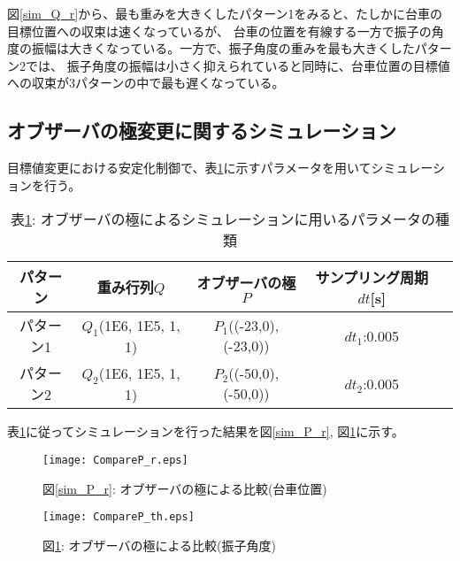 図\ref{sim_Q_r}から、最も重みを大きくしたパターン1をみると、たしかに台車の目標位置への収束は速くなっているが、
台車の位置を有線する一方で振子の角度の振幅は大きくなっている。一方で、振子角度の重みを最も大きくしたパターン2では、
振子角度の振幅は小さく抑えられていると同時に、台車位置の目標値への収束が3パターンの中で最も遅くなっている。

\subsection{オブザーバの極変更に関するシミュレーション}
目標値変更における安定化制御で、表\ref{sim_P}に示すパラメータを用いてシミュレーションを行う。

\begin{table}[htbp]
    \begin{center}
        \caption{表\ref{sim_P}: オブザーバの極によるシミュレーションに用いるパラメータの種類}
        \begin{tabular}{|c|c|c|c|c|} \hline
            パターン & 重み行列$Q$ & オブザーバの極$P$ & サンプリング周期$dt$[s] \\ \hline \hline
            パターン1 & $Q_1$(1E6, 1E5, 1, 1) & $P_1$((-23,0), (-23,0)) & $dt_1$:0.005 \\ \hline
            パターン2 & $Q_2$(1E6, 1E5, 1, 1) & $P_2$((-50,0), (-50,0)) & $dt_2$:0.005 \\ \hline
        \end{tabular}
        \label{sim_P}
    \end{center}
\end{table}

表\ref{sim_P}に従ってシミュレーションを行った結果を図\ref{sim_P_r}, 図\ref{sim_P_th}に示す。

\begin{figure}[htbp]
    \begin{minipage}{0.5\hsize}
        \begin{center}
            \texttt{[image: CompareP\_r.eps]}
            \caption{図\ref{sim_P_r}: オブザーバの極による比較(台車位置)}
            \label{sim_P_r}
        \end{center}
    \end{minipage}
    \begin{minipage}{0.5\hsize}
        \begin{center}
            \texttt{[image: CompareP\_th.eps]}
            \caption{図\ref{sim_P_th}: オブザーバの極による比較(振子角度)}
            \label{sim_P_th}
        \end{center}
    \end{minipage}
\end{figure}

